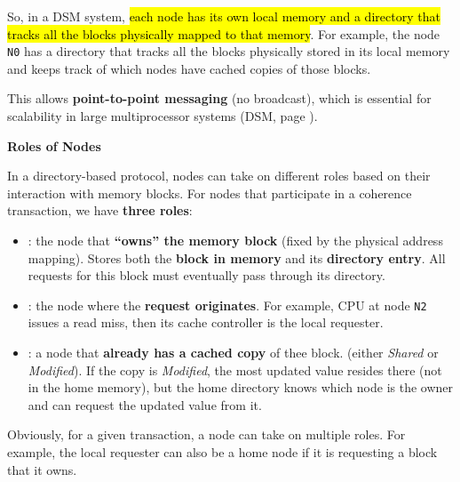 So, in a DSM system, \hl{each node has its own local memory and a directory that tracks all the blocks physically mapped to that memory}. For example, the node \texttt{N0} has a directory that tracks all the blocks physically stored in its local memory and keeps track of which nodes have cached copies of those blocks.

\highspace
This allows \textbf{point-to-point messaging} (no broadcast), which is essential for scalability in large multiprocessor systems (DSM, page \pageref{sec:DSM}).

\highspace
\begin{flushleft}
    \textcolor{Green3}{ \textbf{Roles of Nodes}}
\end{flushleft}
In a directory-based protocol, nodes can take on different roles based on their interaction with memory blocks. For nodes that participate in a coherence transaction, we have \textbf{three roles}:
\begin{itemize}
    \item[\important{\faIcon{home}}] : the node that \textbf{``owns'' the memory block} (fixed by the physical address mapping). Stores both the \textbf{block in memory} and its \textbf{directory entry}. All requests for this block must eventually pass through its directory.
    \item[\important{\faIcon{location-arrow}}] : the node where the \textbf{request originates}. For example, CPU at node \texttt{N2} issues a read miss, then its cache controller is the local requester.
    \item[\important{\faIcon{globe}}] : a node that \textbf{already has a cached copy} of thee block. (either \emph{Shared} or \emph{Modified}). If the copy is \emph{Modified}, the most updated value resides there (not in the home memory), but the home directory knows which node is the owner and can request the updated value from it.
\end{itemize}
Obviously, for a given transaction, a node can take on multiple roles. For example, the local requester can also be a home node if it is requesting a block that it owns.